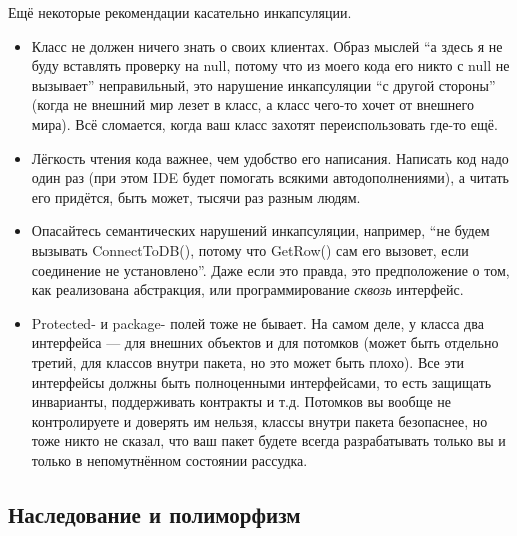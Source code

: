 \documentclass{../../text-style}
\begin{document}
Ещё некоторые рекомендации касательно инкапсуляции.

\begin{itemize}
	\item Класс не должен ничего знать о своих клиентах. Образ мыслей ``а здесь я не буду вставлять проверку на null, потому что из моего кода его никто с null не вызывает'' неправильный, это нарушение инкапсуляции ``с другой стороны'' (когда не внешний мир лезет в класс, а класс чего-то хочет от внешнего мира). Всё сломается, когда ваш класс захотят переиспользовать где-то ещё.
	\item Лёгкость чтения кода важнее, чем удобство его написания. Написать код надо один раз (при этом IDE будет помогать всякими автодополнениями), а читать его придётся, быть может, тысячи раз разным людям.
	\item Опасайтесь семантических нарушений инкапсуляции, например, ``не будем вызывать ConnectToDB(), потому что GetRow() сам его вызовет, если соединение не установлено''. Даже если это правда, это предположение о том, как реализована абстракция, или программирование \textit{сквозь} интерфейс.
	\item Protected- и package- полей тоже не бывает. На самом деле, у класса два интерфейса --- для внешних объектов и для потомков (может быть отдельно третий, для классов внутри пакета, но это может быть плохо). Все эти интерфейсы должны быть полноценными интерфейсами, то есть защищать инварианты, поддерживать контракты и т.д. Потомков вы вообще не контролируете и доверять им нельзя, классы внутри пакета безопаснее, но тоже никто не сказал, что ваш пакет будете всегда разрабатывать только вы и только в непомутнённом состоянии рассудка.
\end{itemize}

\subsection{Наследование и полиморфизм}
\end{document}
